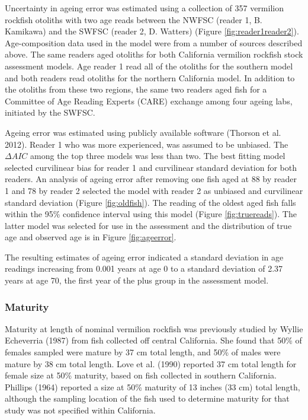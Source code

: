 \documentclass[
  english,
  a4paper,
]{article}
\begin{document}
Uncertainty in ageing error was estimated using a collection of 357 vermilion rockfish
otoliths with two age reads between the NWFSC (reader 1, B. Kamikawa) and the
SWFSC (reader 2, D. Watters) (Figure \ref{fig:reader1reader2}).
Age-composition data used in the model were from a number of sources described
above. The same readers aged otoliths for both California vermilion rockfish stock assessment models.
Age reader 1 read all of the otoliths for the southern model and both readers read
otoliths for the northern California model. In addition to the otoliths from these
two regions, the same two readers aged fish for a Committee of Age Reading Experts
(CARE) exchange among four ageing labs, initiated by the SWFSC.

Ageing error was estimated using publicly available software (Thorson et al. 2012).
Reader 1 who was more
experienced, was assumed to be unbiased. The \(\Delta AIC\) among the top three models was less than two. The
best fitting model selected curvilinear bias for reader 1 and curvilinear standard
deviation for both readers. An analysis of ageing error after removing one fish aged at 88 by reader 1 and 78 by reader 2 selected the model with reader 2 as unbiased and curvilinear standard deviation (Figure \ref{fig:oldfish}). The reading of the oldest aged fish falls within the 95\% confidence interval using this model (Figure \ref{fig:truereads}).
The latter model was selected for use in the assessment and the distribution of
true age and observed age is in Figure \ref{fig:ageerror}.

The resulting estimates of ageing error indicated a standard deviation in age readings
increasing from 0.001 years at age 0 to a standard deviation of 2.37 years at age 70,
the first year of the plus group in the assessment model.

\hypertarget{maturity}{%
\subsubsection{Maturity}\label{maturity}}

Maturity at length of nominal vermilion rockfish was previously studied by Wyllie Echeverria (1987) from fish collected off central California. She found that 50\% of females sampled were mature by 37 cm total length, and 50\% of males were mature by 38 cm total length. Love et al. (1990) reported 37 cm total length for female size at 50\% maturity, based on fish collected in southern California. Phillips (1964) reported a size at 50\% maturity of 13 inches (33 cm) total length, although the sampling location of the fish used to determine maturity for that study was not specified within California.
\end{document}
